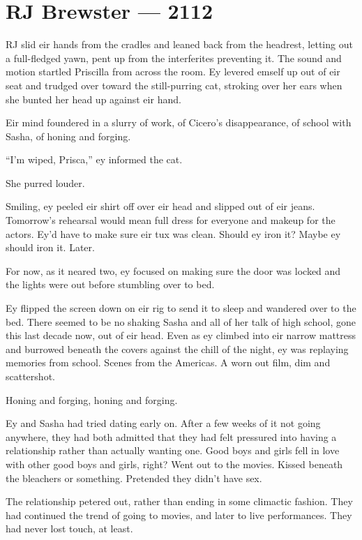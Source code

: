 \hypertarget{rj-brewster-2112}{%
\chapter*{RJ Brewster — 2112}\label{rj-brewster-2112}}

RJ slid eir hands from the cradles and leaned back from the headrest, letting out a full-fledged yawn, pent up from the interferites preventing it. The sound and motion startled Priscilla from across the room. Ey levered emself up out of eir seat and trudged over toward the still-purring cat, stroking over her ears when she bunted her head up against eir hand.

Eir mind foundered in a slurry of work, of Cicero's disappearance, of school with Sasha, of honing and forging.

``I'm wiped, Prisca,'' ey informed the cat.

She purred louder.

Smiling, ey peeled eir shirt off over eir head and slipped out of eir jeans. Tomorrow's rehearsal would mean full dress for everyone and makeup for the actors. Ey'd have to make sure eir tux was clean. Should ey iron it? Maybe ey should iron it. Later.

For now, as it neared two, ey focused on making sure the door was locked and the lights were out before stumbling over to bed.

Ey flipped the screen down on eir rig to send it to sleep and wandered over to the bed. There seemed to be no shaking Sasha and all of her talk of high school, gone this last decade now, out of eir head. Even as ey climbed into eir narrow mattress and burrowed beneath the covers against the chill of the night, ey was replaying memories from school. Scenes from the Americas. A worn out film, dim and scattershot.

Honing and forging, honing and forging.

Ey and Sasha had tried dating early on. After a few weeks of it not going anywhere, they had both admitted that they had felt pressured into having a relationship rather than actually wanting one. Good boys and girls fell in love with other good boys and girls, right? Went out to the movies. Kissed beneath the bleachers or something. Pretended they didn't have sex.

The relationship petered out, rather than ending in some climactic fashion. They had continued the trend of going to movies, and later to live performances. They had never lost touch, at least.

